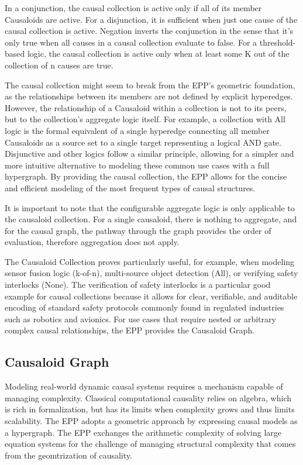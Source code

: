 In a conjunction, the causal collection is active only if all of its member Causaloids are active. For a disjunction, it is sufficient when just one cause of the causal collection is active. Negation inverts the conjunction in the sense that it's only true when all causes in a causal collection evaluate to false. For a threshold-based logic, the causal collection is active only when at least some K out of the collection of n causes are true. 

 The causal collection might seem to break from the EPP's geometric foundation, as the relationships between its members are not defined by explicit hyperedges. However,  the relationship of a Causaloid within a collection is not to its peers, but to the collection's aggregate logic itself. For example, a collection with All logic is the formal equivalent of a single hyperedge connecting all member Causaloids as a source set to a single target representing a logical AND gate. Disjunctive and other logics follow a similar principle, allowing for a simpler and more intuitive alternative to modeling these common use cases with a full hypergraph. By providing the causal collection, the EPP allows for the concise and efficient modeling of the most frequent types of causal structures.
 
 It is important to note that the configurable aggregate logic is only applicable to the causaloid collection. For a single causaloid, there is nothing to aggregate, and for the causal graph, the pathway through the graph provides the order of evaluation, therefore aggregation does not apply. 
 
  The Causaloid Collection proves particularly useful, for example, when modeling sensor fusion logic (k-of-n), multi-source object detection (All), or verifying safety interlocks (None). The verification of safety interlocks is a particular good example for causal collections because it allows for clear, verifiable, and auditable encoding of standard safety protocols commonly found in regulated industries such as robotics and avionics. For use cases that require nested or arbitrary complex causal relationships, the EPP provides the Causaloid Graph.

%
%
\subsection{Causaloid Graph}
\label{sec:epp_causaloid_graph}

Modeling real-world dynamic causal systems requires a mechanism capable of managing complexity.
Classical computational causality relies on algebra, which is rich in formalization,
but has its limits when complexity grows and thus limits scalability. The EPP adopts 
a geometric approach by expressing causal models as a hypergraph. The EPP
exchanges the arithmetic complexity of solving large equation systems for the challenge of managing structural complexity that comes from the geomtrization of causality.

